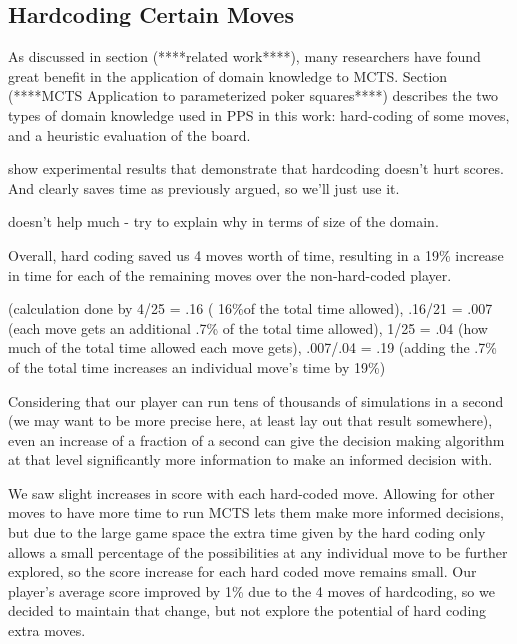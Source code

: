 \documentclass[letterpaper]{article}
\begin{document}
\subsection{Hardcoding Certain Moves}

As discussed in section (****related work****), many researchers have found great benefit in the application of domain knowledge to MCTS. Section (****MCTS Application to parameterized poker squares****) describes the two types of domain knowledge used in PPS in this work: hard-coding of some moves, and a heuristic evaluation of the board.

show experimental results that demonstrate that hardcoding doesn't hurt scores. And clearly saves time as previously argued, so we'll just use it.

doesn't help much - try to explain why in terms of size of the domain.

Overall, hard coding saved us 4 moves worth of time, resulting in a 19\% increase in time for each of the remaining moves over the non-hard-coded player.
	
(calculation done by 4/25 = .16 ( 16\%of the total time allowed), .16/21 = .007 (each move gets an additional .7\% of the total time allowed), 1/25 = .04 (how much of the total time allowed each move gets), .007/.04 = .19 (adding the .7\% of the total time increases an individual move’s time by 19\%)

Considering that our player can run tens of thousands of simulations in a second (we may want to be more precise here, at least lay out that result somewhere), even an increase of a fraction of a second can give the decision making algorithm at that level significantly more information to make an informed decision with.

We saw slight increases in score with each hard-coded move. Allowing for other moves to have more time to run MCTS lets them make more informed decisions, but due to the large game space the extra time given by the hard coding only allows a small percentage of the possibilities at any individual move to be further explored, so the score increase for each hard coded move remains small. Our player’s average score improved by 1\% due to the 4 moves of hardcoding, so we decided to maintain that change, but not explore the potential of hard coding extra moves.

\end{document}
